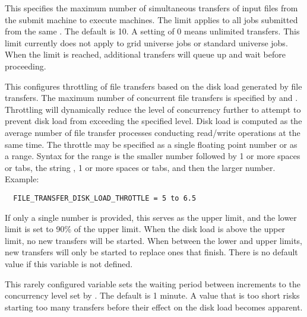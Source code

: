 \begin{description}
\label{param:MaxConcurrentUploads}
\item[\Macro{MAX\_CONCURRENT\_UPLOADS}]
  This specifies the maximum
  number of simultaneous transfers of input files from the submit
  machine to execute machines.  The limit applies to all jobs
  submitted from the same .  The default is 10.  A
  setting of 0 means unlimited transfers.  This limit currently does
  not apply to grid universe jobs or standard universe jobs.  When the
  limit is reached, additional transfers will queue up and wait before
  proceeding.

\label{param:FileTransferDiskLoadThrottle}
\item[\Macro{FILE\_TRANSFER\_DISK\_LOAD\_THROTTLE}]
  This configures throttling of file transfers based on the disk load
  generated by file transfers.  The maximum number of concurrent file
  transfers is specified by  and
  .  Throttling will dynamically
  reduce the level of concurrency further to attempt to prevent disk
  load from exceeding the specified level.  Disk load is computed as
  the average number of file transfer processes conducting read/write
  operations at the same time.  The throttle may be specified as a
  single floating point number or as a range.  
  Syntax for the range is the smaller number
  followed by 1 or more spaces or tabs, the string ,
  1 or more spaces or tabs, and then the larger number.
  Example: 
\begin{verbatim}
  FILE_TRANSFER_DISK_LOAD_THROTTLE = 5 to 6.5
\end{verbatim}
  If only a single number is provided, this serves as the
  upper limit, and the lower limit is set to 90\% of the upper limit.
  When the disk load is above the upper limit, no new transfers
  will be started.  When between the lower and upper limits, new
  transfers will only be started to replace ones that finish.
  There is no default value if this variable is not defined.

\label{param:FileTransferDiskLoadThrottleWaitBetweenIncrements}
\item[\Macro{FILE\_TRANSFER\_DISK\_LOAD\_THROTTLE\_WAIT\_BETWEEN\_INCREMENTS}]
  This rarely configured variable sets the waiting period between
  increments to the concurrency level set by 
  .
  The default is 1 minute.  A value that is too short risks starting
  too many transfers before their effect on the disk load becomes apparent.


\end{description}
